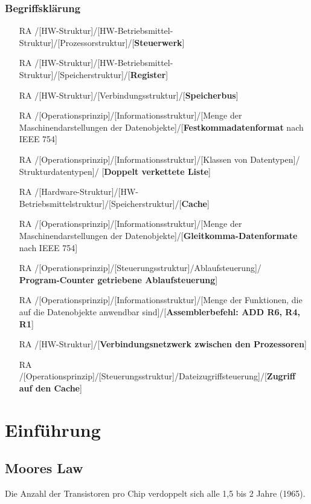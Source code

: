 \subsubsection{Begriffsklärung}
\begin{itemize}
	\item [RA]/[HW-Struktur]/[HW-Betriebsmittel-Struktur]/[Prozessorstruktur]/[\textbf{Steuerwerk}]
	\item [RA]/[HW-Struktur]/[HW-Betriebsmittel-Struktur]/[Speicherstruktur]/[\textbf{Register}]
	\item [RA]/[HW-Struktur]/[Verbindungsstruktur]/[\textbf{Speicherbus}]
	\item [RA]/[Operationsprinzip]/[Informationsstruktur]/[Menge der Maschinendarstellungen der Datenobjekte]/[\textbf{Festkommadatenformat} nach IEEE 754]
	\item[RA]/[Operationsprinzip]/[Informationsstruktur]/[Klassen von Datentypen]/\\ Strukturdatentypen]/ [\textbf{Doppelt verkettete Liste}]
	\item [RA]/[Hardware-Struktur]/[HW-Betriebsmittelstruktur]/[Speicherstruktur]/[\textbf{Cache}]
	\item [RA]/[Operationsprinzip]/[Informationsstruktur]/[Menge der Maschinendarstellungen der Datenobjekte]/[\textbf{Gleitkomma-Datenformate} nach IEEE 754]
	\item [RA]/[Operationsprinzip]/[Steuerungsstruktur]/Ablaufsteuerung]/\\\textbf{Program-Counter getriebene Ablaufsteuerung}]
	\item [RA]/[Operationsprinzip]/[Informationsstruktur]/[Menge der Funktionen, die auf die Datenobjekte anwendbar sind]/[\textbf{Assemblerbefehl: ADD R6, R4, R1}]
	\item [RA]/[HW-Struktur]/[\textbf{Verbindungsnetzwerk zwischen den Prozessoren}]
	\item [RA]/[Operationsprinzip]/[Steuerungsstruktur]/Dateizugriffsteuerung]/[\textbf{Zugriff auf den Cache}]
\end{itemize}
\section{Einführung}
\subsection{Moores Law}
Die Anzahl der Transistoren pro Chip verdoppelt sich alle 1,5 bis 2 Jahre (1965).

